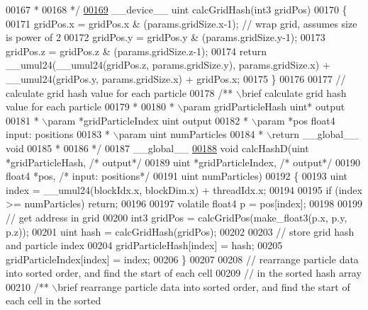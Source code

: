 \begin{DoxyCode}
00167 \textcolor{comment}{ *}
00168 \textcolor{comment}{ */}
\hypertarget{particles__kernel__impl_8cuh_source_l00169}{}\hyperlink{particles__kernel__impl_8cuh_ad20ac253847311c176aacf9a224e14e5}{00169} \_\_device\_\_ uint calcGridHash(int3 gridPos)
00170 \{
00171     gridPos.x = gridPos.x & (params.gridSize.x-1);  \textcolor{comment}{// wrap grid, assumes size is power of 2}
00172     gridPos.y = gridPos.y & (params.gridSize.y-1);
00173     gridPos.z = gridPos.z & (params.gridSize.z-1);
00174     \textcolor{keywordflow}{return} \_\_umul24(\_\_umul24(gridPos.z, params.gridSize.y), params.gridSize.x) + \_\_umul24(gridPos.y, 
      params.gridSize.x) + gridPos.x;
00175 \}
00176 
00177 \textcolor{comment}{// calculate grid hash value for each particle}
00178 \textcolor{comment}{/** \(\backslash\)brief calculate grid hash value for each particle}
00179 \textcolor{comment}{ *}
00180 \textcolor{comment}{ * \(\backslash\)param gridParticleHash uint* output}
00181 \textcolor{comment}{ * \(\backslash\)param *gridParticleIndex uint output}
00182 \textcolor{comment}{ * \(\backslash\)param *pos float4 input: positions}
00183 \textcolor{comment}{ * \(\backslash\)param  uint    numParticles}
00184 \textcolor{comment}{ * \(\backslash\)return \_\_global\_\_ void}
00185 \textcolor{comment}{ *}
00186 \textcolor{comment}{ */}
00187 \_\_global\_\_
\hypertarget{particles__kernel__impl_8cuh_source_l00188}{}\hyperlink{particles__kernel__impl_8cuh_a4c688195fb1c2963cbdcaf62c737b9d7}{00188} \textcolor{keywordtype}{void} calcHashD(uint   *gridParticleHash,  \textcolor{comment}{/* output*/}
00189                 uint   *gridParticleIndex, \textcolor{comment}{/* output*/}
00190                 float4 *pos,               \textcolor{comment}{/* input: positions*/}
00191                 uint    numParticles)
00192 \{
00193     uint index = \_\_umul24(blockIdx.x, blockDim.x) + threadIdx.x;
00194 
00195     \textcolor{keywordflow}{if} (index >= numParticles) \textcolor{keywordflow}{return};
00196 
00197     \textcolor{keyword}{volatile} float4 p = pos[index];
00198 
00199     \textcolor{comment}{// get address in grid}
00200     int3 gridPos = calcGridPos(make\_float3(p.x, p.y, p.z));
00201     uint hash = calcGridHash(gridPos);
00202 
00203     \textcolor{comment}{// store grid hash and particle index}
00204     gridParticleHash[index] = hash;
00205     gridParticleIndex[index] = index;
00206 \}
00207 
00208 \textcolor{comment}{// rearrange particle data into sorted order, and find the start of each cell}
00209 \textcolor{comment}{// in the sorted hash array}
00210 \textcolor{comment}{/** \(\backslash\)brief rearrange particle data into sorted order, and find the start of each cell in the sorted
}
\end{DoxyCode}

